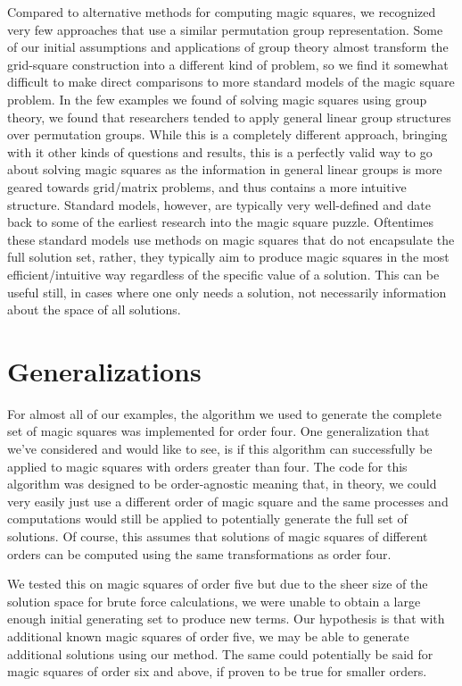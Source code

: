 \documentclass[12pt]{report}
\begin{document}
\par Compared to alternative methods for computing magic squares, we recognized very few approaches
that use a similar permutation group representation. Some of our initial assumptions and
applications of group theory almost transform the grid-square construction into a different kind of
problem, so we find it somewhat difficult to make direct comparisons to more standard models of the
magic square problem. In the few examples we found of solving magic squares using group theory, we
found that researchers tended to apply general linear group structures over permutation groups.
While this is a completely different approach, bringing with it other kinds of questions and
results, this is a perfectly valid way to go about solving magic squares as the information in
general linear groups is more geared towards grid/matrix problems, and thus contains a more
intuitive structure. Standard models, however, are typically very well-defined and date back to
some of the earliest research into the magic square puzzle. Oftentimes these standard models use
methods on magic squares that do not encapsulate the full solution set, rather, they typically aim
to produce magic squares in the most efficient/intuitive way regardless of the specific value of a
solution. This can be useful still, in cases where one only needs a solution, not necessarily
information about the space of all solutions.

\section{Generalizations}

\par For almost all of our examples, the algorithm we used to generate the complete set of magic
squares was implemented for order four. One generalization that we've considered and would like to
see, is if this algorithm can successfully be applied to magic squares with orders greater than
four. The code for this algorithm was designed to be order-agnostic meaning that, in theory, we
could very easily just use a different order of magic square and the same processes and
computations would still be applied to potentially generate the full set of solutions. Of course,
this assumes that solutions of magic squares of different orders can be computed using the same
transformations as order four.

\par We tested this on magic squares of order five but due to the sheer size of the solution space
for brute force calculations, we were unable to obtain a large enough initial generating set to
produce new terms. Our hypothesis is that with additional known magic squares of order five, we may
be able to generate additional solutions using our method. The same could potentially be said for
magic squares of order six and above, if proven to be true for smaller orders.
\end{document}
